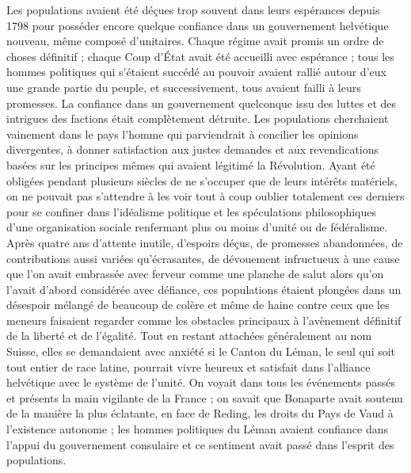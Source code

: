 \documentclass[french,twoside]{book} %
\begin{document}
Les populations avaient été déçues trop souvent dans leurs espérances depuis 1798 pour posséder encore quelque confiance dans un gouvernement helvétique nouveau, même composé d’unitaires. Chaque régime avait promis un ordre de choses définitif ; chaque Coup d’État avait été accueilli avec espérance ; tous les hommes politiques qui s’étaient succédé au pouvoir avaient rallié autour d’eux une grande partie du peuple, et successivement, tous avaient failli à leurs promesses. La confiance dans un gouvernement quelconque issu des luttes et des intrigues des factions était complètement détruite. Les populations cherchaient vainement dans le pays l’homme qui parviendrait à concilier les opinions divergentes, à donner satisfaction aux justes demandes et aux revendications basées sur les principes mêmes qui avaient légitimé la Révolution. Ayant été obligées pendant plusieurs siècles de ne s’occuper que de leurs intérêts matériels, on ne pouvait pas s’attendre à les voir tout à coup oublier totalement ces derniers pour se confiner dans l’idéalisme politique et les spéculations philosophiques d’une organisation sociale renfermant plus ou moins d’unité ou de fédéralisme. Après quatre ans d’attente inutile, d’espoirs déçus, de promesses abandonnées, de contributions aussi variées qu’écrasantes, de dévouement infructueux à une cause que l’on avait embrassée avec ferveur comme une planche de salut alors qu’on l’avait d’abord considérée avec défiance, ces populations étaient plongées dans un désespoir mélangé de beaucoup de colère et même de haine contre ceux que les meneurs faisaient regarder comme les obstacles principaux à l’avènement définitif de la liberté et de l’égalité. Tout en restant attachées généralement au nom Suisse, elles se demandaient avec anxiété si le Canton du Léman, le seul qui soit tout entier de race latine, pourrait vivre heureux et satisfait dans l’alliance helvétique avec le système de l’unité. On voyait dans tous les événements passés et présents la main vigilante de la France ; on savait que Bonaparte avait soutenu de la manière la plus éclatante, en face de Reding, les droits du Pays de Vaud à l’existence autonome ; les hommes politiques du Léman avaient confiance dans l’appui du gouvernement consulaire et ce sentiment avait passé dans l’esprit des populations.\par
\end{document}
